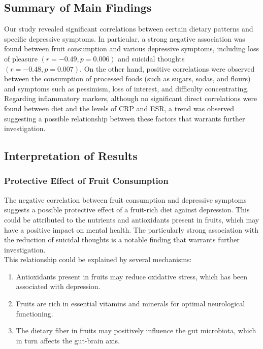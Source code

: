 \documentclass[jou]{apa7}
\begin{document}
\subsection{Summary of Main Findings}\label{resumen-de-hallazgos-principales}

Our study revealed significant correlations between certain dietary patterns and specific depressive symptoms. In particular, a strong negative association was found between fruit consumption and various depressive symptoms, including loss of pleasure $(r = -0.49, p = 0.006)$ and suicidal thoughts $(r = -0.48, p = 0.007)$. On the other hand, positive correlations were observed between the consumption of processed foods (such as sugars, sodas, and flours) and symptoms such as pessimism, loss of interest, and difficulty concentrating.\\

Regarding inflammatory markers, although no significant direct correlations were found between diet and the levels of CRP and ESR, a trend was observed suggesting a possible relationship between these factors that warrants further investigation.

\subsection{Interpretation of Results}\label{interpretaciuxf3n-de-resultados}

\subsubsection{Protective Effect of Fruit Consumption}

The negative correlation between fruit consumption and depressive symptoms suggests a possible protective effect of a fruit-rich diet against depression. This could be attributed to the nutrients and antioxidants present in fruits, which may have a positive impact on mental health. The particularly strong association with the reduction of suicidal thoughts is a notable finding that warrants further investigation.\\

This relationship could be explained by several mechanisms:

\begin{enumerate}
	\item Antioxidants present in fruits may reduce oxidative stress, which has been associated with depression.\\

	\item Fruits are rich in essential vitamins and minerals for optimal neurological functioning.\\

	\item The dietary fiber in fruits may positively influence the gut microbiota, which in turn affects the gut-brain axis.
\end{enumerate}
\end{document}
